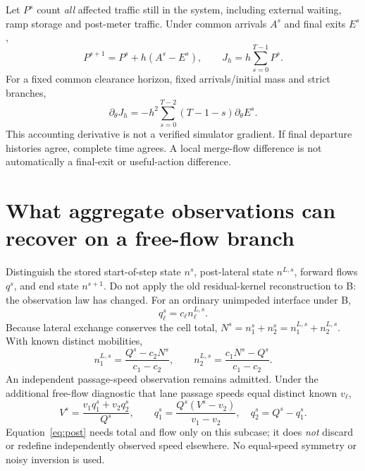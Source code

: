 \documentclass[10pt,a4paper]{article}
\begin{document}
Let $P^s$ count \emph{all} affected traffic still in the system, including
external waiting, ramp storage and post-meter traffic. Under common arrivals
$A^s$ and final exits $E^s$,
\begin{equation}
P^{s+1}=P^s+h(A^s-E^s),\qquad J_h=h\sum_{s=0}^{T-1}P^s.
\end{equation}
For a fixed common clearance horizon, fixed arrivals/initial mass and strict
branches,
\begin{equation}
\partial_\theta J_h
=-h^2\sum_{s=0}^{T-2}(T-1-s)\partial_\theta E^s.
\end{equation}
This accounting derivative is not a verified simulator gradient.
If final departure histories agree, complete time agrees. A local merge-flow
difference is not automatically a final-exit or useful-action difference.
\newpage

\section{What aggregate observations can recover on a free-flow branch}
Distinguish the stored start-of-step state $n^s$, post-lateral state
$n^{L,s}$, forward flows $q^s$, and end state $n^{s+1}$.
Do not apply the old residual-kernel reconstruction to B: the observation law
has changed. For an ordinary unimpeded interface under B,
\begin{equation}
q_\ell^s=c_\ell n_\ell^{L,s}.
\end{equation}
Because lateral exchange conserves the cell total,
$N^s=n_1^s+n_2^s=n_1^{L,s}+n_2^{L,s}$. With known distinct mobilities,
\begin{equation}
n_1^{L,s}=\frac{Q^s-c_2N^s}{c_1-c_2},\qquad
n_2^{L,s}=\frac{c_1N^s-Q^s}{c_1-c_2}.
\label{eq:post}
\end{equation}
An independent passage-speed observation remains admitted. Under the additional
free-flow diagnostic that lane passage speeds equal distinct known $v_\ell$,
\begin{equation}
V^s=\frac{v_1q_1^s+v_2q_2^s}{Q^s},\qquad
q_1^s=\frac{Q^s(V^s-v_2)}{v_1-v_2},\quad q_2^s=Q^s-q_1^s.
\end{equation}
Equation~\eqref{eq:post} needs total and flow only on this subcase; it does
\emph{not} discard or redefine independently observed speed elsewhere.
No equal-speed symmetry or noisy inversion is used.
\end{document}
